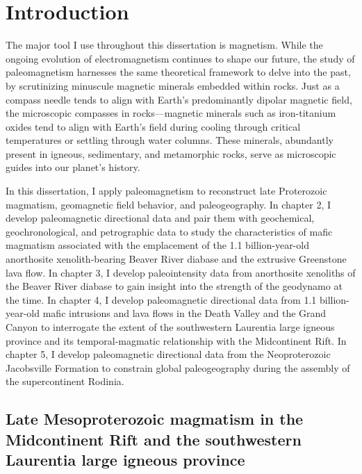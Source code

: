 \chapter[Introduction][Introduction]{Introduction}

The major tool I use throughout this dissertation is magnetism. While the ongoing evolution of electromagnetism continues to shape our future, the study of paleomagnetism harnesses the same theoretical framework to delve into the past, by scrutinizing minuscule magnetic minerals embedded within rocks. Just as a compass needle tends to align with Earth's predominantly dipolar magnetic field, the microscopic compasses in rocks---magnetic minerals such as iron-titanium oxides tend to align with Earth's field during cooling through critical temperatures or settling through water columns. These minerals, abundantly present in igneous, sedimentary, and metamorphic rocks, serve as microscopic guides into our planet's history.

In this dissertation, I apply paleomagnetism to reconstruct late Proterozoic magmatism, geomagnetic field behavior, and paleogeography. In chapter 2, I develop paleomagnetic directional data and pair them with geochemical, geochronological, and petrographic data to study the characteristics of mafic magmatism associated with the emplacement of the 1.1 billion-year-old anorthosite xenolith-bearing Beaver River diabase and the extrusive Greenstone lava flow. In chapter 3, I develop paleointensity data from anorthosite xenoliths of the Beaver River diabase to gain insight into the strength of the geodynamo at the time. In chapter 4, I develop paleomagnetic directional data from 1.1 billion-year-old mafic intrusions and lava flows in the Death Valley and the Grand Canyon to interrogate the extent of the southwestern Laurentia large igneous province and its temporal-magmatic relationship with the Midcontinent Rift. In chapter 5, I develop paleomagnetic directional data from the Neoproterozoic Jacobsville Formation to constrain global paleogeography during the assembly of the supercontinent Rodinia. 

\section{Late Mesoproterozoic magmatism in the Midcontinent Rift and the southwestern Laurentia large igneous province}

